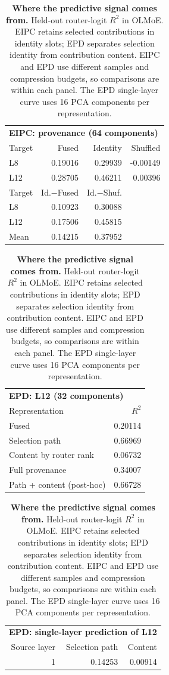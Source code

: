 \begin{table}[t]
\centering\small
\caption{\textbf{Where the predictive signal comes from.} Held-out router-logit $R^2$ in OLMoE. EIPC retains selected contributions in identity slots; EPD separates selection identity from contribution content. EIPC and EPD use different samples and compression budgets, so comparisons are within each panel. The EPD single-layer curve uses 16 PCA components per representation.}
\label{tab:provenance}
\begin{minipage}[t]{0.49\textwidth}
\vspace{0pt}
\centering
\begin{tabular}{lrrr}
\toprule
\multicolumn{4}{l}{\textbf{EIPC: provenance (64 components)}}\\
Target & Fused & Identity & Shuffled\\
\midrule
L8 & 0.19016 & 0.29939 & -0.00149 \\
L12 & 0.28705 & 0.46211 & 0.00396 \\
\midrule
Target & Id.$-$Fused & Id.$-$Shuf. & \\
L8 & 0.10923 & 0.30088 &  \\
L12 & 0.17506 & 0.45815 &  \\
Mean & 0.14215 & 0.37952 &  \\
\bottomrule
\end{tabular}
\par\medskip
\begin{tabular}{lr}
\toprule
\multicolumn{2}{l}{\textbf{EPD: L12 (32 components)}}\\
Representation & $R^2$\\
\midrule
Fused & 0.20114 \\
Selection path & 0.66969 \\
Content by router rank & 0.06732 \\
Full provenance & 0.34007 \\
Path + content (post-hoc) & 0.66728 \\
\bottomrule
\end{tabular}
\end{minipage}\hfill
\begin{minipage}[t]{0.47\textwidth}
\vspace{0pt}
\centering
\begin{tabular}{rrr}
\toprule
\multicolumn{3}{l}{\textbf{EPD: single-layer prediction of L12}}\\
Source layer & Selection path & Content\\
\midrule
1 & 0.14253 & 0.00914 \\

\end{tabular}
\end{minipage}
\end{table}
